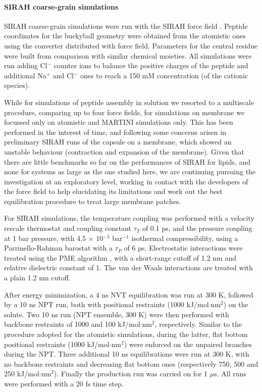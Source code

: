 \paragraph{SIRAH coarse-grain simulations}
SIRAH coarse-grain simulations were run with the SIRAH force field \cite{Machado2018}. Peptide coordinates for the buckyball geometry were obtained from the atomistic ones using the converter distributed with force field. Parameters for the central residue were built from comparison with similar chemical moieties. All simulations were run adding Cl$^-$ counter ions to balance the positive charges of the peptide and additional Na$^+$  and Cl$^-$ ones to reach a 150 mM concentration (of the cationic species).

While for simulations of peptide assembly in solution we resorted to a multiscale procedure, comparing up to four force fields, for simulations on membrane we focussed only on atomistic and MARTINI simulations only. This has been performed in the interest of time, and following some concerns arisen in preliminary SIRAH runs of the capsule on a membrane, which showed an unstable behaviour (contraction and expansion of the membrane).
%
Given that there are little benchmarks so far on the performances of SIRAH for lipids, and none for systems as large as the one studied here, we are continuing pursuing the investigation at an exploratory level, working in contact with the developers of the force field to help elucidating its limitations and work out the best equilibration procedure to treat large membrane patches.

For SIRAH simulations, the temperature coupling was performed with a velocity rescale thermostat \cite{Bussi2007} and coupling constant $\tau _T$ of 0.1 ps, and the pressure coupling at 1 bar pressure, with 4.5 $\times$ 10$^{-5}$ bar$^{-1}$ isothermal compressibility, using a Parrinello-Rahman barostat \cite{Parrinello1981} with a $\tau _P$ of 6 ps. Electrostatic interactions were treated using the PME algorithm \cite{Essmann1995}, with a short-range cutoff of 1.2 nm and relative dielectric constant of 1. The van der Waals interactions are treated with a plain 1.2 nm cutoff.

After energy minimization, a 4 ns NVT equilibration was run at 300 K, followed by a 10 ns NPT run, both with positional restraints (1000 kJ/mol$\cdot$nm$^2$) on the solute. Two 10 ns run (NPT ensemble, 300 K) were then performed with backbone restraints of 1000 and 100 kJ/mol$\cdot$nm$^2$, respectively. Similar to the procedure adopted for the atomistic simulations, during the latter, flat bottom positional restraints (1000 kJ/mol$\cdot$nm$^2$) were enforced on the unpaired branches during the NPT. Three additional 10 ns equilibrations were run at 300 K, with no backbone restraints and decreasing flat bottom ones (respectively 750, 500 and 250 kJ/mol$\cdot$nm$^2$). Finally the production run was carried on for 1 $\mu$s. All runs were performed with a 20 fs time step.

